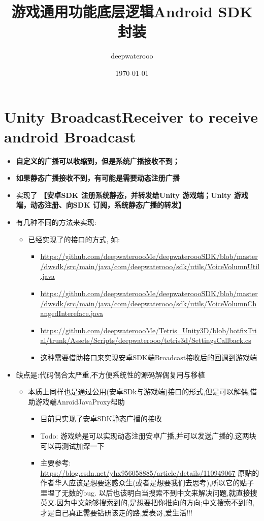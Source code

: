 \documentclass[9pt, b5paper]{article}
\author{deepwaterooo}
\date{\today}
\title{游戏通用功能底层逻辑Android SDK 封装}
\begin{document}
\maketitle
\tableofcontents


\section{Unity BroadcastReceiver to receive android Broadcast}
\label{sec-1}
\begin{itemize}
\item \textbf{自定义的广播可以收缩到，但是系统广播接收不到；}
\item \textbf{如果静态广播接收不到，有可能是需要动态注册广播}
\item 实现了 \textbf{【安卓SDK 注册系统静态，并转发给Unity 游戏端；Unity 游戏端，动态注册、向SDK 订阅，系统静态广播的转发】}
\item 有几种不同的方法来实现:
\begin{itemize}
\item 已经实现了的接口的方式, 如:
\begin{itemize}
\item \url{https://github.com/deepwateroooMe/deepwateroooSDK/blob/master/dwsdk/src/main/java/com/deepwaterooo/sdk/utils/VoiceVolumnUtil.java}
\item \url{https://github.com/deepwateroooMe/deepwateroooSDK/blob/master/dwsdk/src/main/java/com/deepwaterooo/sdk/utils/VoiceVolumnChangedIntereface.java}
\item \url{https://github.com/deepwateroooMe/Tetris_Unity3D/blob/hotfixTrial/trunk/Assets/Scripts/deepwaterooo/tetris3d/SettingsCallback.cs}
\item 这种需要借助接口来实现安卓SDK端Broadcast接收后的回调到游戏端
\end{itemize}
\end{itemize}
\item 缺点是:代码偶合太严重,不方便系统性的源码解偶复用与移植

\begin{itemize}
\item 本质上同样也是通过公用(安卓SDk与游戏端)接口的形式,但是可以解偶,借助游戏端AnroidJavaProxy帮助
\begin{itemize}
\item 目前只实现了安卓SDK静态广播的接收
\item Todo: 游戏端是可以实现动态注册安卓广播,并可以发送广播的.这两块可以再测试加深一下
\item 主要参考: \url{https://blog.csdn.net/yhx956058885/article/details/110949067} 原贴的作者华人应该是想要迷惑众生(或者是想要我们去思考),所以它的贴子里埋了无数的bug. 以后也该明白当搜索不到中文来解决问题,就直接搜英文.因为中文能够搜索到的,是想要把你推向的方向;中文搜索不到的,才是自己真正需要钻研该走的路,爱表哥,爱生活!!!
\end{itemize}


\end{itemize}
\end{itemize}
\end{document}
